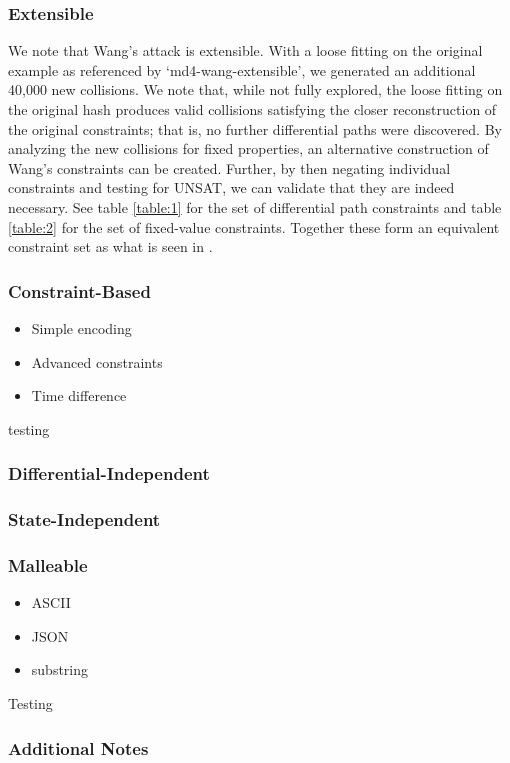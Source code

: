 \documentclass[letterpaper,twocolumn,10pt]{article}
\begin{document}
\subsubsection{Extensible}
We note that Wang's attack is extensible. With a loose fitting on the original
example as referenced by `md4-wang-extensible', we generated an additional
40,000 new collisions. We note that, while not fully explored, the loose
fitting on the original hash produces valid collisions satisfying the closer
reconstruction of the original constraints; that is, no further differential
paths were discovered. By analyzing the new collisions for fixed properties,
an alternative construction of Wang's constraints can be created. Further,
by then negating individual constraints and testing for UNSAT, we can validate
that they are indeed necessary. See table \ref{table:1} for the set of differential
path constraints and table \ref{table:2} for the set of fixed-value constraints.
Together these form an equivalent constraint set as what is seen in \cite{Wang2005}.


\subsubsection{Constraint-Based}
\begin{itemize}
    \item Simple encoding
    \item Advanced constraints
    \item Time difference
\end{itemize}
testing
\subsubsection{Differential-Independent}
\subsubsection{State-Independent}
\subsubsection{Malleable}
\begin{itemize}
    \item ASCII
    \item JSON
    \item substring
\end{itemize}
Testing
\subsubsection{Additional Notes}
\end{document}
